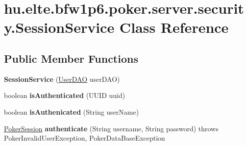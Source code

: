 \hypertarget{classhu_1_1elte_1_1bfw1p6_1_1poker_1_1server_1_1security_1_1_session_service}{}\section{hu.\+elte.\+bfw1p6.\+poker.\+server.\+security.\+Session\+Service Class Reference}
\label{classhu_1_1elte_1_1bfw1p6_1_1poker_1_1server_1_1security_1_1_session_service}
\subsection*{Public Member Functions}
\begin{DoxyCompactItemize}
\item 
\hypertarget{classhu_1_1elte_1_1bfw1p6_1_1poker_1_1server_1_1security_1_1_session_service_a3bf03e31de3848f5d49f784317ebaaa6}{}{\bfseries Session\+Service} (\hyperlink{classhu_1_1elte_1_1bfw1p6_1_1poker_1_1persist_1_1dao_1_1_user_d_a_o}{User\+D\+A\+O} user\+D\+A\+O)\label{classhu_1_1elte_1_1bfw1p6_1_1poker_1_1server_1_1security_1_1_session_service_a3bf03e31de3848f5d49f784317ebaaa6}

\item 
\hypertarget{classhu_1_1elte_1_1bfw1p6_1_1poker_1_1server_1_1security_1_1_session_service_a2544cd3b6861eef9432d57b86d292f84}{}boolean {\bfseries is\+Authenticated} (U\+U\+I\+D uuid)\label{classhu_1_1elte_1_1bfw1p6_1_1poker_1_1server_1_1security_1_1_session_service_a2544cd3b6861eef9432d57b86d292f84}

\item 
\hypertarget{classhu_1_1elte_1_1bfw1p6_1_1poker_1_1server_1_1security_1_1_session_service_a9cd1415da3b1c6055a40b18e5e17e942}{}boolean {\bfseries is\+Authenicated} (String user\+Name)\label{classhu_1_1elte_1_1bfw1p6_1_1poker_1_1server_1_1security_1_1_session_service_a9cd1415da3b1c6055a40b18e5e17e942}

\item 
\hypertarget{classhu_1_1elte_1_1bfw1p6_1_1poker_1_1server_1_1security_1_1_session_service_ab9da876d93582ff7f06e13802bef581b}{}\hyperlink{classhu_1_1elte_1_1bfw1p6_1_1poker_1_1model_1_1_poker_session}{Poker\+Session} {\bfseries authenticate} (String username, String password)  throws Poker\+Invalid\+User\+Exception, Poker\+Data\+Base\+Exception \label{classhu_1_1elte_1_1bfw1p6_1_1poker_1_1server_1_1security_1_1_session_service_ab9da876d93582ff7f06e13802bef581b}


\end{DoxyCompactItemize}
